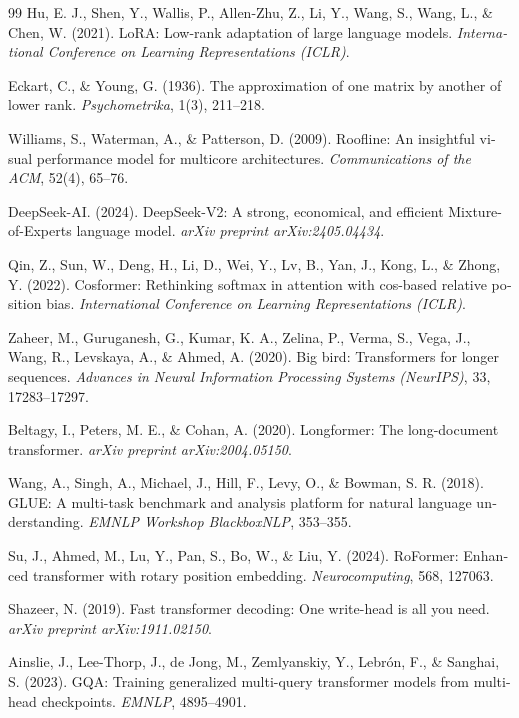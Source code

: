 \documentclass[12pt,a4paper]{report}
\theoremstyle{definition}
\begin{document}
\begin{latin}
\begin{thebibliography}{99}
Hu, E. J., Shen, Y., Wallis, P., Allen-Zhu, Z., Li, Y., Wang, S., Wang, L., \& Chen, W. (2021).
LoRA: Low-rank adaptation of large language models.
\textit{International Conference on Learning Representations (ICLR)}.

Eckart, C., \& Young, G. (1936).
The approximation of one matrix by another of lower rank.
\textit{Psychometrika}, 1(3), 211--218.

Williams, S., Waterman, A., \& Patterson, D. (2009).
Roofline: An insightful visual performance model for multicore architectures.
\textit{Communications of the ACM}, 52(4), 65--76.

DeepSeek-AI. (2024).
DeepSeek-V2: A strong, economical, and efficient Mixture-of-Experts language model.
\textit{arXiv preprint arXiv:2405.04434}.

Qin, Z., Sun, W., Deng, H., Li, D., Wei, Y., Lv, B., Yan, J., Kong, L., \& Zhong, Y. (2022).
Cosformer: Rethinking softmax in attention with cos-based relative position bias.
\textit{International Conference on Learning Representations (ICLR)}.

Zaheer, M., Guruganesh, G., Kumar, K. A., Zelina, P., Verma, S., Vega, J., Wang, R., Levskaya, A., \& Ahmed, A. (2020).
Big bird: Transformers for longer sequences.
\textit{Advances in Neural Information Processing Systems (NeurIPS)}, 33, 17283--17297.

Beltagy, I., Peters, M. E., \& Cohan, A. (2020).
Longformer: The long-document transformer.
\textit{arXiv preprint arXiv:2004.05150}.

Wang, A., Singh, A., Michael, J., Hill, F., Levy, O., \& Bowman, S. R. (2018).
GLUE: A multi-task benchmark and analysis platform for natural language understanding.
\textit{EMNLP Workshop BlackboxNLP}, 353--355.

Su, J., Ahmed, M., Lu, Y., Pan, S., Bo, W., \& Liu, Y. (2024).
RoFormer: Enhanced transformer with rotary position embedding.
\textit{Neurocomputing}, 568, 127063.

Shazeer, N. (2019).
Fast transformer decoding: One write-head is all you need.
\textit{arXiv preprint arXiv:1911.02150}.

Ainslie, J., Lee-Thorp, J., de Jong, M., Zemlyanskiy, Y., Lebr{\'o}n, F., \& Sanghai, S. (2023).
GQA: Training generalized multi-query transformer models from multi-head checkpoints.
\textit{EMNLP}, 4895--4901.


\end{thebibliography}
\end{latin}
\end{document}
